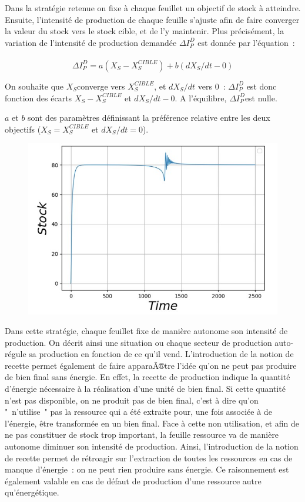 \documentclass[12pt,a4paper]{article}%
\begin{document}
Dans la stratégie retenue on fixe à chaque feuillet un objectif de stock
à atteindre. Ensuite, l'intensité de production de chaque feuille s'ajuste
afin de faire converger la valeur du stock vers le stock cible, et de l'y
maintenir. Plus précisément, la variation de l'intensité de production
demandée $\Delta I_{P}^{D}$ est donnée par
l'équation~:$\ \ \ \ \ \ \ \ \ \ \ \ \ \ \ \ $%
\[
\Delta I_{P}^{D}=a(X_{S}-X_{S}^{CIBLE})+b(dX_{S}/dt-0)
\]


On souhaite que $X_{S}$converge vers $X_{S}^{CIBLE}$, et $dX_{S}/dt$ vers 0~:
$\Delta I_{P}^{D}$ est donc fonction des écarts $X_{S}-X_{S}^{CIBLE}$ et
$dX_{S}/dt-0$. A l'équilibre, $\Delta I_{P}^{D}$est nulle.

$a$ et $b$ sont des paramètres définissant la préférence relative entre
les deux objectifs ($X_{S}=X_{S}^{CIBLE}$ et $dX_{S}/dt=0$).

\begin{figure}[h]
\centering
\includegraphics[width=1.0\textwidth]{figures/Stock-t.jpg}\end{figure}

Dans cette stratégie, chaque feuillet fixe de manière autonome son
intensité de production. On décrit ainsi une situation o{u} chaque secteur
de production auto-régule sa production en fonction de ce qu'il vend.
L'introduction de la notion de recette permet également de faire apparaÃ®tre
l'idée qu'on ne peut pas produire de bien final sans énergie. En effet, la
recette de production indique la quantité d'énergie nécessaire à la
réalisation d'une unité de bien final. Si cette quantité n'est pas disponible,
on ne produit pas de bien final, c'est à dire qu'on "~n'utilise~" pas la
ressource qui a été extraite pour, une fois associée à de l'énergie, être
transformée en un bien final. Face à cette non utilisation, et afin de ne
pas constituer de stock trop important, la feuille ressource va de manière
autonome diminuer son intensité de production. Ainsi, l'introduction de la
notion de recette permet de rétroagir sur l'extraction de toutes les
ressources en cas de manque d'énergie~: on ne peut rien produire sans énergie.
Ce raisonnement est également valable en cas de défaut de production d'une
ressource autre qu'énergétique.
\end{document}
